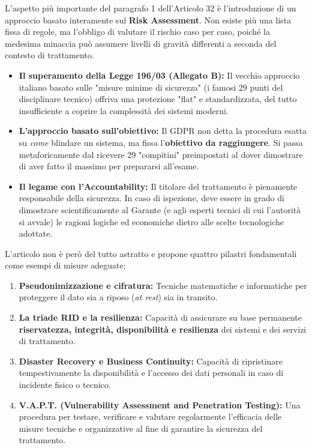 L'aspetto più importante del paragrafo 1 dell'Articolo 32 è l'introduzione di un approccio basato interamente sul \textbf{Risk Assessment}.
Non esiste più una lista fissa di regole, ma l'obbligo di valutare il rischio caso per caso, poiché la medesima minaccia può assumere livelli di gravità differenti a seconda del contesto di trattamento.
\begin{itemize}
    \item \textbf{Il superamento della Legge 196/03 (Allegato B):} Il vecchio approccio italiano basato sulle "misure minime di sicurezza" (i famosi 29 punti del disciplinare tecnico) offriva una protezione "flat" e standardizzata, del tutto insufficiente a coprire la complessità dei sistemi moderni.
    \item \textbf{L'approccio basato sull'obiettivo:} Il GDPR non detta la procedura esatta su \textit{come} blindare un sistema, ma fissa l'\textbf{obiettivo da raggiungere}. Si passa metaforicamente dal ricevere 29 "compitini" preimpostati al dover dimostrare di aver fatto il massimo per prepararsi all'esame.
    \item \textbf{Il legame con l'Accountability:} Il titolare del trattamento è pienamente responsabile della sicurezza. In caso di ispezione, deve essere in grado di dimostrare scientificamente al Garante (e agli esperti tecnici di cui l'autorità si avvale) le ragioni logiche ed economiche dietro alle scelte tecnologiche adottate.
\end{itemize}

L'articolo non è però del tutto astratto e propone quattro pilastri fondamentali come esempi di misure adeguate:

\begin{enumerate}[label=\alph*)]
    \item \textbf{Pseudonimizzazione e cifratura:} Tecniche matematiche e informatiche per proteggere il dato sia a riposo (\textit{at rest}) sia in transito.
    \item \textbf{La triade RID e la resilienza:} Capacità di assicurare su base permanente \textbf{riservatezza, integrità, disponibilità e resilienza} dei sistemi e dei servizi di trattamento.
    \item \textbf{Disaster Recovery e Business Continuity:} Capacità di ripristinare tempestivamente la disponibilità e l'accesso dei dati personali in caso di incidente fisico o tecnico.
    \item \textbf{V.A.P.T. (Vulnerability Assessment and Penetration Testing):} Una procedura per testare, verificare e valutare regolarmente l'efficacia delle misure tecniche e organizzative al fine di garantire la sicurezza del trattamento.
\end{enumerate}

